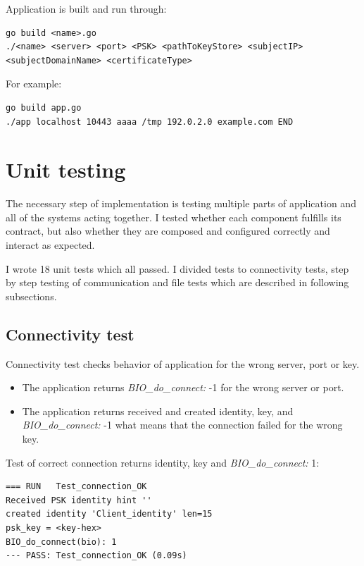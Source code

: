 \documentclass[
  12pt, 
  digital, %
  notable,   %
  nolof,     %
  nolot,     %
]{fithesis3}
\begin{document}
Application is built and run through:
\begin{lstlisting}
go build <name>.go
./<name> <server> <port> <PSK> <pathToKeyStore> <subjectIP> <subjectDomainName> <certificateType>
\end{lstlisting}

For example:
\begin{lstlisting}
go build app.go
./app localhost 10443 aaaa /tmp 192.0.2.0 example.com END
\end{lstlisting}



\section{Unit testing}

The necessary step of implementation is testing multiple parts of application and all of the 
systems acting together. I tested whether each component fulfills its contract, but also whether 
they are composed and configured correctly and interact as expected. 

I wrote 18 unit tests which all passed. I divided tests to connectivity tests, step by step testing of communication and file tests which are described in following subsections.

\subsection{Connectivity test}

Connectivity test checks behavior of application for the wrong server, port or key.
\begin{itemize}[leftmargin=2em,rightmargin=1em,itemsep=0.75\parskip,parsep=0em,topsep=0em,partopsep=0em]
\item The application returns \textit{BIO\_do\_connect:} -1 for the wrong server or port.
\item The application returns received and created identity, key, and \textit{BIO\_do\_connect:} -1 what means that the connection failed for the wrong key.
\end{itemize}
Test of correct connection returns identity, key and \textit{BIO\_do\_connect:} 1:
\begin{lstlisting}
=== RUN   Test_connection_OK
Received PSK identity hint ''
created identity 'Client_identity' len=15
psk_key = <key-hex>
BIO_do_connect(bio): 1
--- PASS: Test_connection_OK (0.09s)
\end{lstlisting}
\end{document}
